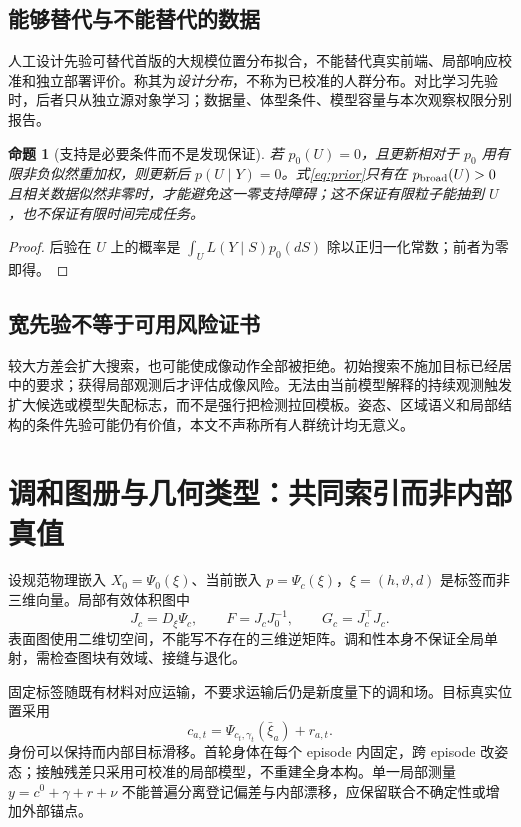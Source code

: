 \documentclass[UTF8,fontset=fandol,11pt,a4paper]{ctexart}
\theoremstyle{plain}
\newtheorem{proposition}[theorem]{命题}
\theoremstyle{definition}
\theoremstyle{remark}
\numberwithin{equation}{section}
\begin{document}
\subsection{能够替代与不能替代的数据}
人工设计先验可替代首版的大规模位置分布拟合，不能替代真实前端、局部响应校准和独立部署评价。称其为\emph{设计分布}，不称为已校准的人群分布。对比学习先验时，后者只从独立源对象学习；数据量、体型条件、模型容量与本次观察权限分别报告。

\begin{proposition}[支持是必要条件而不是发现保证]
若 $p_0(U)=0$，且更新相对于 $p_0$ 用有限非负似然重加权，则更新后 $p(U\mid Y)=0$。式\eqref{eq:prior}只有在 $p_{\rm broad}(U)>0$ 且相关数据似然非零时，才能避免这一零支持障碍；这不保证有限粒子能抽到 $U$，也不保证有限时间完成任务。
\end{proposition}
\begin{proof}后验在 $U$ 上的概率是 $\int_U L(Y\mid S)p_0(dS)$ 除以正归一化常数；前者为零即得。\end{proof}

\subsection{宽先验不等于可用风险证书}
较大方差会扩大搜索，也可能使成像动作全部被拒绝。初始搜索不施加目标已经居中的要求；获得局部观测后才评估成像风险。无法由当前模型解释的持续观测触发扩大候选或模型失配标志，而不是强行把检测拉回模板。姿态、区域语义和局部结构的条件先验可能仍有价值，本文不声称所有人群统计均无意义。

\section{调和图册与几何类型：共同索引而非内部真值}
\label{sec:geometry}
设规范物理嵌入 $X_0=\Psi_0(\xi)$、当前嵌入 $p=\Psi_c(\xi)$，$\xi=(h,\vartheta,d)$ 是标签而非三维向量。局部有效体积图中
\begin{equation}
J_c=D_\xi\Psi_c,\qquad F=J_cJ_0^{-1},\qquad G_c=J_c^\top J_c.
\end{equation}
表面图使用二维切空间，不能写不存在的三维逆矩阵。调和性本身不保证全局单射，需检查图块有效域、接缝与退化。

固定标签随既有材料对应运输，不要求运输后仍是新度量下的调和场。目标真实位置采用
\begin{equation}
c_{a,t}=\Psi_{c_t,\gamma_t}(\bar\xi_a)+r_{a,t}.
\label{eq:anchor}
\end{equation}
身份可以保持而内部目标滑移。首轮身体在每个 episode 内固定，跨 episode 改姿态；接触残差只采用可校准的局部模型，不重建全身本构。单一局部测量 $y=c^0+\gamma+r+\nu$ 不能普遍分离登记偏差与内部漂移，应保留联合不确定性或增加外部锚点。
\end{document}
